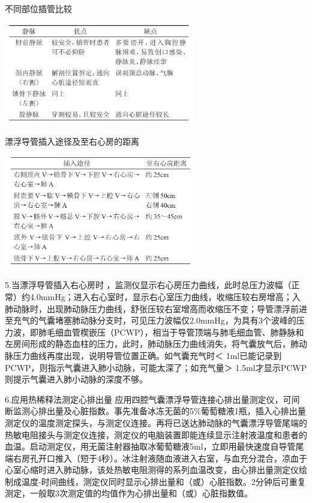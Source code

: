 \begin{table}[htbp]
\centering
\caption{不同部位插管比较}
\label{tab139-1}
\includegraphics[width=3.27083in,height=1.76042in]{./images/Image00525.jpg}
\end{table}

\begin{table}[htbp]
\centering
\caption{漂浮导管插入途径及至右心房的距离}
\label{tab139-2}
\includegraphics[width=3.28125in,height=1.94792in]{./images/Image00526.jpg}
\end{table}

5.当漂浮导管插入右心房时
，监测仪显示右心房压力曲线，此时总压力波幅（正常）约4.0mmHg；进入右心室时，显示右心室压力曲线，收缩压较右房增高；入肺动脉时，出现肺动脉压力曲线，舒张压较右室增高而收缩压不变；导管漂浮前进至充气的气囊堵塞肺动脉分支时，可见压力波幅仅2.0mmHg，为具有3个波峰的压力波，即肺毛细血管楔嵌压（PCWP），相当于导管顶端与肺毛细血管、肺静脉和左房间形成的静态血柱的压力，此时，肺动脉压力曲线消失，将气囊放气后，肺动脉压力曲线再度出现，说明导管位置正确。如气囊充气时＜
1ml已能记录到PCWP，则指示气囊进入肺小动脉，可能太深了；如充气量＞
1.5ml才显示PCWP则提示气囊进入肺小动脉的深度不够。

6.应用热稀释法测定心排出量
应用四腔气囊漂浮导管连接心排出量测定仪，可间断监测心排出量及心脏指数。事先准备冰冻无菌的5\%葡萄糖液1瓶，插入心排出量测定仪的温度测定探头，与测定仪连接。再将已送达肺动脉的气囊漂浮导管尾端的热敏电阻接头与测定仪连接，测定仪的电脑装置即能连续显示注射液温度和患者的血温。启动测定仪，用无菌注射器抽取冰葡萄糖液5ml，立即用最快速度自导管尾端右房孔开口推入（短于4秒）。冰注射液随血液进入右室，与血充分混合，凉血于心室心缩时进入肺动脉，该处热敏电阻测得的系列血温改变，由心排出量测定仪绘制成温度-时间曲线，测定仪同时显示心排出量和（或）心脏指数。2分钟后可重复测定，一般取3次测定值的均值作为心排出量和（或）心脏指数值。

